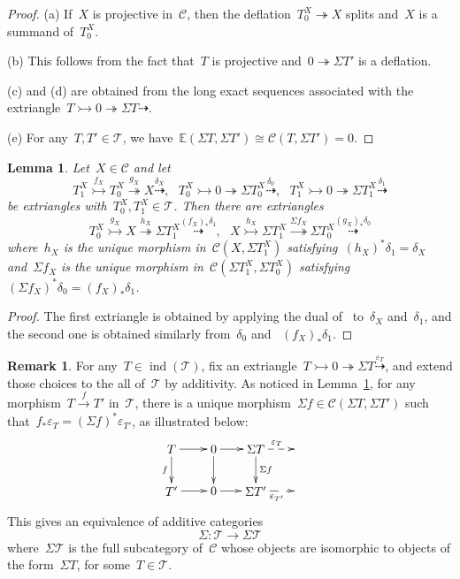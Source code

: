 \documentclass{amsart}
\newtheorem{lemma}[theorem]{Lemma}
\theoremstyle{definition}
\newtheorem{remark}[theorem]{Remark}
\newcommand{\cat}{\mathcal{C}}
\newcommand{\susp}{\Sigma}
\newcommand{\ind}{\operatorname{ind}}
\newcommand{\tc}{\mathcal{T}}
\newcommand{\infl}{\rightarrowtail}
\newcommand{\defl}{\twoheadrightarrow}
\newcommand{\eps}{\varepsilon}
\begin{document}
\begin{proof}
(a) If~$X$ is projective in~$\cat$, then the deflation~$T_0^X\defl X$ splits and~$X$ is a summand of~$T_0^X$.

(b) This follows from the fact that~$T$ is projective and~$0\defl\susp T'$ is a deflation.

(c) and (d) are obtained from the long exact sequences associated with the extriangle~$T\infl 0\defl \susp T\dashrightarrow$.

(e) For any~$T,T'\in\tc$, we have~$\mathbb{E}(\susp T,\susp T') \cong \cat(T,\susp T')=0$.
\end{proof}

\begin{lemma}\label{lemma::shifts of extriangles}
Let~$X\in\cat$ and let
\[
T_1^X\overset{f_X}{\infl} T_0^X\overset{g_X}{\defl} X \overset{\delta_X}{\dashrightarrow}, \ \ \ T_0^X\infl 0\defl \susp T_0^X\overset{\delta_0}{\dashrightarrow}, \ \ \ T_1^X\infl 0\defl \susp T_1^X\overset{\delta_1}{\dashrightarrow}
\]
be extriangles with~$T_0^X,T_1^X\in\tc$.
Then there are extriangles
\[
T_0^X\overset{g_X}{\infl} X \overset{h_X}{\defl} \susp T_1^X \overset{(f_X)_\ast\delta_1}{\dashrightarrow}, \ \ \ X \overset{h_X}{\infl} \susp T_1^X \overset{\susp f_X}{\defl} \susp T_0^X \overset{(g_X)_\ast\delta_0}{\dashrightarrow}
\]
where~$h_X$ is the unique morphism in~$\cat(X,\susp T_1^X)$ satisfying~$(h_X)^\ast\delta_1=\delta_X$ and~$\susp f_X$ is the unique morphism in~$\cat(\susp T_1^X,\susp T_0^X)$ satisfying~$(\susp f_X)^\ast\delta_0 = (f_X)_\ast\delta_1$.
\end{lemma}

\begin{proof}
The first extriangle is obtained by applying the dual of~\cite[Proposition 3.15]{NakaokaPalu} to~$\delta_X$ and~$\delta_1$, and the second one is obtained similarly from~$\delta_0$ and ~$(f_X)_\ast \delta_1$.
\end{proof}

\begin{remark}\label{remark::equivalence Sigma}
For any~$T\in\ind(\tc)$, fix an extriangle~$T\infl 0\defl\susp T\overset{\eps_T}{\dashrightarrow}$, and extend those choices to the all of~$\tc$ by additivity.
As noticed in Lemma~\ref{lemma::shifts of extriangles}, for any morphism~$T\overset{f}{\to}T'$ in~$\tc$, there is a unique morphism~$\susp f\in\cat(\susp T,\susp T')$ such that~$f_\ast\eps_T=(\susp f)^\ast\eps_{T'}$, as illustrated below:
\[
\xy
(-12,6)*+{T}="0";
(0,6)*+{0}="2";
(12,6)*+{\susp T}="4";
(24,6)*+{}="6";
%
(-12,-6)*+{T'}="10";
(0,-6)*+{0}="12";
(12,-6)*+{\susp T'}="14";
(24,-6)*+{}="16";
%
{\ar "0";"2"};
{\ar "2";"4"};
{\ar@{-->}^{\eps_T} "4";"6"};
%
{\ar_{f} "0";"10"};
{\ar "2";"12"};
{\ar^{\susp f} "4";"14"};
%
{\ar "10";"12"};
{\ar "12";"14"};
{\ar@{-->}_{\eps_{T'}} "14";"16"};
\endxy
\]
This gives an equivalence of additive categories
\[
 \susp: \tc \to \susp\tc
\]
where~$\susp\tc$ is the full subcategory of~$\cat$ whose objects are isomorphic to objects of the form~$\susp T$, for some~$T\in\tc$.
\end{remark}
\end{document}
